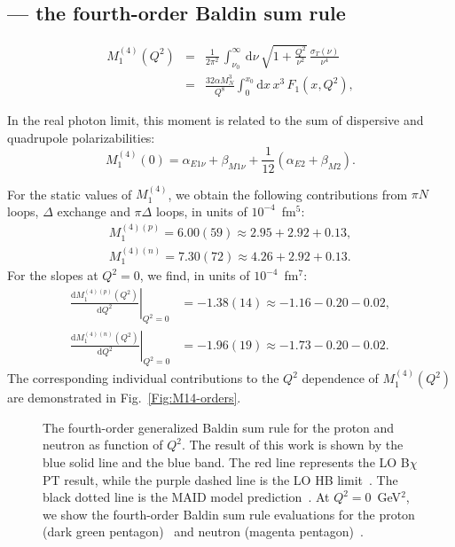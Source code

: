 \documentclass[12pt,preprint,tightenlines,
showpacs,preprintnumbers,amsmath,amssymb,
a4paper,nofootinbib]{revtex4-1}
\def\beq{\begin{equation}}
\def\eeq{\end{equation}}
\def\bea{\begin{eqnarray}}
\def\eea{\end{eqnarray}}
\def\al{\alpha}
\def\nn{\nonumber}
\def\dd{\mathrm{d}}
\begin{document}
\subsection{ --- the fourth-order Baldin sum rule}

\bea
 M_1^{(4)}(Q^2)&=& 
\frac{1}{2 \pi^2} \, \int_{\nu_0}^{\infty}\, \mathrm{d}\nu \,\sqrt{1+\frac{Q^2}{\nu^{2}}}\, \frac{\sigma_T(\nu)}{\nu^{4} }\\
&=&\frac{32 \al M_N^3}{Q^8}\int_0^{x_0}\!\dd x\, x^3 \,F_1(x,Q^2) \nn, 
\eea

In the real photon limit, this moment is related to the sum of dispersive and quadrupole polarizabilities:
\beq
M_1^{(4)}(0)=\alpha_{E1 \nu} + \beta_{M1 \nu} + \frac{1}{12} (\alpha_{E2} + \beta_{M2}) .
\eeq

For the static values of $M_1^{(4)}$,
we obtain the following contributions from $\pi N$ loops,  $\Delta$ exchange and $\pi\Delta$ loops, in units of $10^{-4}$~fm$^5$:
\begin{align}
M_1^{(4)(p)}=6.00(59)\approx2.95+2.92+0.13, \\
M_1^{(4)(n)}=7.30(72) \approx 4.26+2.92+0.13.
\end{align}
For the slopes at $Q^2=0$, we find, in units of $10^{-4}$~fm$^7$:
\begin{align}
\left.\frac{\dd M_1^{(4)(p)} (Q^2)}{\dd Q^2}\right|_{Q^2=0}&=-1.38(14)\approx -1.16-0.20-0.02  ,  \\
\left.\frac{\dd M_1^{(4)(n)} (Q^2)}{\dd Q^2}\right|_{Q^2=0}&=-1.96(19) \approx -1.73-0.20-0.02.
\end{align}
 The corresponding individual contributions to the $Q^2$ dependence
of $M_1^{(4)}(Q^2)$ are demonstrated in Fig.~\ref{Fig:M14-orders}.

\begin{figure}[hbt]
\begin{center}
\caption{
The fourth-order generalized Baldin sum rule for the proton and neutron  as function of $Q^2$.  
The result of this work is shown by the blue solid line and the blue band.
The red line represents the LO B$\chi$PT result, while the purple dashed line is the LO HB limit~\cite{Nevado:2007dd}.
The black dotted line is the MAID model prediction~\cite{Drechsel:2000ct,Drechsel:1998hk,private-Lothar}.
At $Q^2=0$~GeV$^2$, we show the fourth-order Baldin sum rule evaluations for the proton (dark green pentagon)~\cite{Gryniuk:2015aa} and neutron (magenta pentagon)~\cite{Schroder:1977sn}.
 \label{Fig:M14plot}}
\end{center}
\end{figure}
\end{document}
